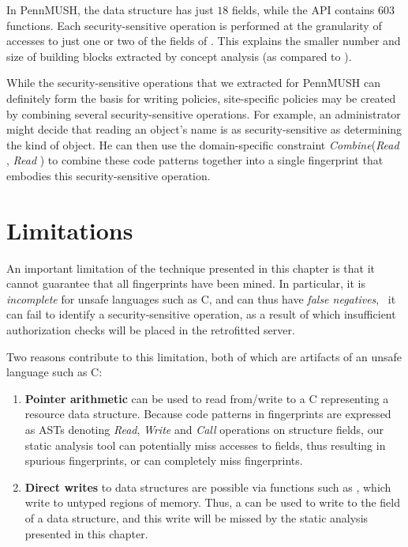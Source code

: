 In PennMUSH, the  data structure has just $18$ fields, while the
API contains $603$ functions. Each security-sensitive operation is performed at
the granularity of accesses to just one or two of the fields of .
This explains the smaller number and size of building blocks extracted
by concept analysis (as compared to \xserver). 

While the security-sensitive operations that we extracted for PennMUSH can
definitely form the basis for writing policies, site-specific policies may be
created by combining several security-sensitive operations. For example, an
administrator might decide that reading an object's name is as
security-sensitive as determining the kind of object.  He can then use the
domain-specific constraint \textit{Combine}(\textit{Read}
, \textit{Read} ) to combine these code
patterns together into a single fingerprint that embodies this
security-sensitive operation.

\section{Limitations}
\label{chapter:static:section:limitations}

An important limitation of the technique presented in this chapter is that it
cannot guarantee that all fingerprints have been mined. In particular, it is
\textit{incomplete} for unsafe languages such as C, and can thus have
\textit{false negatives}, \ie~it can fail to identify a security-sensitive
operation, as a result of which insufficient authorization checks will be
placed in the retrofitted server. 

Two reasons contribute to this limitation, both of which are artifacts of
an unsafe language such as C:

\begin{enumerate}

\item \textbf{Pointer arithmetic} can be used to read from/write to a C
 representing a resource data structure. Because code patterns in
fingerprints are expressed as ASTs denoting \textit{Read}, \textit{Write} and
\textit{Call} operations on structure fields, our static analysis tool can
potentially miss accesses to fields, thus resulting in spurious fingerprints,
or can completely miss fingerprints.

\item \textbf{Direct writes} to data structures are possible via functions such
as , which write to untyped regions of memory. Thus, a
 can be used to write to the field of a data structure, and this
write will be missed by the static analysis presented in this chapter.

\end{enumerate}

